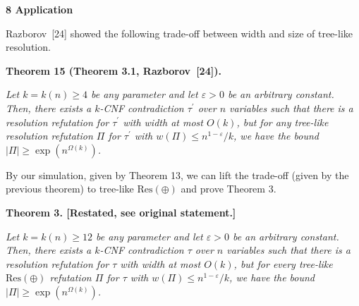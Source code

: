 \documentclass[10pt,a4paper]{article}
\begin{document}
\par\medskip\noindent\textbf{
8 Application}\par




Razborov [24] showed the following trade-off between width and size of tree-like resolution.\par





\par\medskip\noindent\textbf{
\textbf{Theorem 15}\textbf{ }(Theorem 3.1, Razborov [24])\textbf{.}
}\par



\emph{Let $k=k(n)\geq 4$ be any parameter and let $\varepsilon>0$ be an arbitrary constant.
Then, there exists a $k$-CNF contradiction $\tau^{\prime}$ over $n$ variables such that there is a resolution refutation for $\tau^{\prime}$ with width at most $O(k)$, but for any tree-like resolution refutation $\Pi$ for $\tau^{\prime}$ with $w(\Pi)\leq n^{1-\varepsilon}/k$, we have the bound $|\Pi|\geq\exp(n^{\Omega(k)})$.}\par






By our simulation, given by Theorem 13, we can lift the trade-off (given by the previous theorem) to tree-like $\text{Res}(\oplus)$ and prove Theorem 3.\par






\par\medskip\noindent\textbf{
\textbf{Theorem 3}\textbf{.}
[Restated, see original statement.]}\par



\emph{Let $k=k(n)\geq 12$ be any parameter and let $\varepsilon>0$ be an arbitrary constant.
Then, there exists a $k$-CNF contradiction $\tau$ over $n$ variables such that there is a resolution refutation for $\tau$ with width at most $O(k)$, but for every tree-like $\text{Res}(\oplus)$ refutation $\Pi$ for $\tau$ with $w(\Pi)\leq n^{1-\varepsilon}/k$, we have the bound $|\Pi|\geq\exp(n^{\Omega(k)})$.}\par



\end{document}
